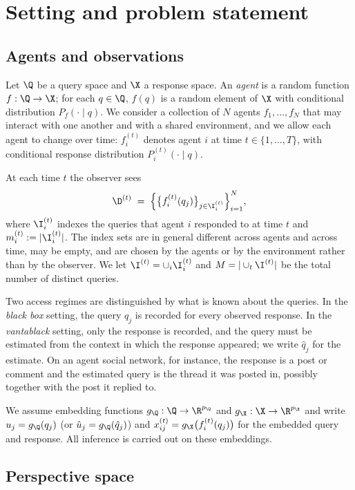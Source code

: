 \section{Setting and problem statement}
\label{sec:setting}

\subsection{Agents and observations}

Let $\Q$ be a query space and $\X$ a response space. An \emph{agent} is a random function $f:\Q\to\X$; for each $q\in\Q$, $f(q)$ is a random element of $\X$ with conditional distribution $P_f(\cdot\mid q)$. We consider a collection of $N$ agents $f_1,\dots,f_N$ that may interact with one another and with a shared environment, and we allow each agent to change over time: $f_i^{(t)}$ denotes agent $i$ at time $t\in\{1,\dots,T\}$, with conditional response distribution $P_i^{(t)}(\cdot\mid q)$.

At each time $t$ the observer sees
\begin{equation}
\label{eq:obs}
\D^{(t)} \;=\; \Big\{\big\{ f_i^{(t)}(q_j) \big\}_{j\in\I_i^{(t)}}\Big\}_{i=1}^{N},
\end{equation}
where $\I_i^{(t)}$ indexes the queries that agent $i$ responded to at time $t$ and $m_i^{(t)} := |\I_i^{(t)}|$. The index sets are in general different across agents and across time, may be empty, and are chosen by the agents or by the environment rather than by the observer. We let $\I^{(t)} = \cup_i \I_i^{(t)}$ and $M = |\cup_t \I^{(t)}|$ be the total number of distinct queries.

Two access regimes are distinguished by what is known about the queries. In the \emph{black box} setting, the query $q_j$ is recorded for every observed response. In the \emph{vantablack} setting, only the response is recorded, and the query must be estimated from the context in which the response appeared; we write $\hat q_j$ for the estimate. On an agent social network, for instance, the response is a post or comment and the estimated query is the thread it was posted in, possibly together with the post it replied to.

We assume embedding functions $g_\Q:\Q\to\R^{p_\Q}$ and $g_\X:\X\to\R^{p_\X}$ and write $u_j = g_\Q(q_j)$ (or $\hat u_j = g_\Q(\hat q_j)$) and $x_{ij}^{(t)} = g_\X\big(f_i^{(t)}(q_j)\big)$ for the embedded query and response. All inference is carried out on these embeddings.

\subsection{Perspective space}
\label{sec:ps}

